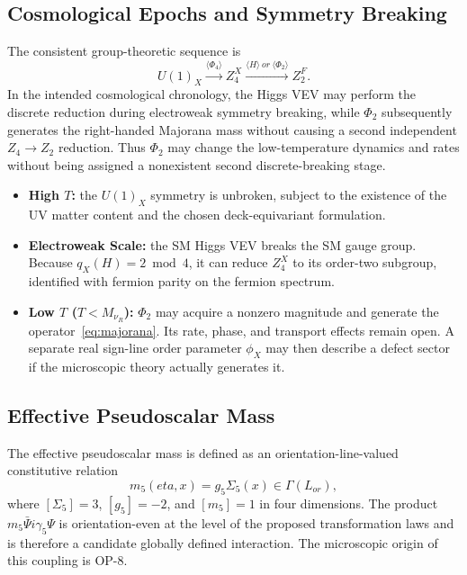 \documentclass[11pt]{article}
\theoremstyle{canonmath}
\theoremstyle{canonpostulate}
\theoremstyle{canonclaim}
\providecommand{\Lor}{\mathcal L_{\mathrm{or}}}
\def\mathrm#1{#1}%
\def\mathbb#1{#1}%
\def\mathcal#1{#1}%
\def\eta{eta}%
\begin{document}
\subsection{Cosmological Epochs and Symmetry Breaking}

The consistent group-theoretic sequence is
\begin{equation}
U(1)_X
\xrightarrow{\langle\Phi_4\rangle}
\mathbb Z_4^X
\xrightarrow{\langle H\rangle\ \mathrm{or}\ \langle\Phi_2\rangle}
\mathbb Z_2^F.
\end{equation}
In the intended cosmological chronology, the Higgs VEV may perform the discrete reduction during electroweak symmetry breaking, while $\Phi_2$ subsequently generates the right-handed Majorana mass without causing a second independent $\mathbb Z_4\to\mathbb Z_2$ reduction. Thus $\Phi_2$ may change the low-temperature dynamics and rates without being assigned a nonexistent second discrete-breaking stage.

\begin{itemize}
\item \textbf{High $T$:} the $U(1)_X$ symmetry is unbroken, subject to the existence of the UV matter content and the chosen deck-equivariant formulation.
\item \textbf{Electroweak Scale:} the SM Higgs VEV breaks the SM gauge group. Because $q_X(H)=2\bmod4$, it can reduce $\mathbb Z_4^X$ to its order-two subgroup, identified with fermion parity on the fermion spectrum.
\item \textbf{Low $T$ ($T<M_{\nu_R}$):} $\Phi_2$ may acquire a nonzero magnitude and generate the operator~\eqref{eq:majorana}. Its rate, phase, and transport effects remain open. A separate real sign-line order parameter $\phi_X$ may then describe a defect sector if the microscopic theory actually generates it.
\end{itemize}

\subsection{Effective Pseudoscalar Mass}

The effective pseudoscalar mass is defined as an orientation-line-valued constitutive relation
\begin{equation}
m_5(\eta,x)=g_5\Sigma_5(x)\in\Gamma(\Lor),
\end{equation}
where $[\Sigma_5]=3$, $[g_5]=-2$, and $[m_5]=1$ in four dimensions. The product $m_5\bar\Psi i\gamma_5\Psi$ is orientation-even at the level of the proposed transformation laws and is therefore a candidate globally defined interaction. The microscopic origin of this coupling is OP-8.
\end{document}
